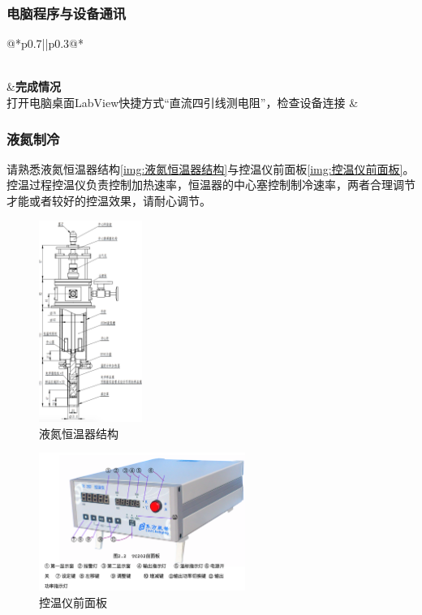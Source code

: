 \documentclass{spaexp}
\begin{document}
            \subsubsection{电脑程序与设备通讯}
                \begin{longtable}{@{*}p{}||p{}@{*}}
                    \caption{电脑程序与设备通讯操作步骤}\\
                    \hline\hline
                    &\textbf{完成情况}\\
                    \hline\hline
                    打开电脑桌面LabView快捷方式“直流四引线测电阻”，检查设备连接 & \\ \hline
                \end{longtable}

            \subsubsection{液氮制冷}
                请熟悉液氮恒温器结构\autoref{img:液氮恒温器结构}与控温仪前面板\autoref{img:控温仪前面板}。控温过程控温仪负责控制加热速率，恒温器的中心塞控制制冷速率，两者合理调节
                才能或者较好的控温效果，请耐心调节。

                \begin{figure}
                    \ct
                    \caption{液氮恒温器结构}
                    \label{img:液氮恒温器结构}
                    \includegraphics[width = 0.3\textwidth]{TempertureKeeper.png}
                \end{figure}
                \begin{figure}
                    \ct
                    \caption{控温仪前面板}
                    \label{img:控温仪前面板}
                    \includegraphics[width = 0.6\textwidth]{PIDFront.png}
                \end{figure}
\end{document}
